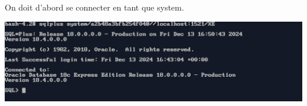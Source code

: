 On doit d'abord se connecter en tant que system.



\begin{center}
    \includegraphics[width=\textwidth]{ScreenShot/Partie1/connect.png}
\end{center}

